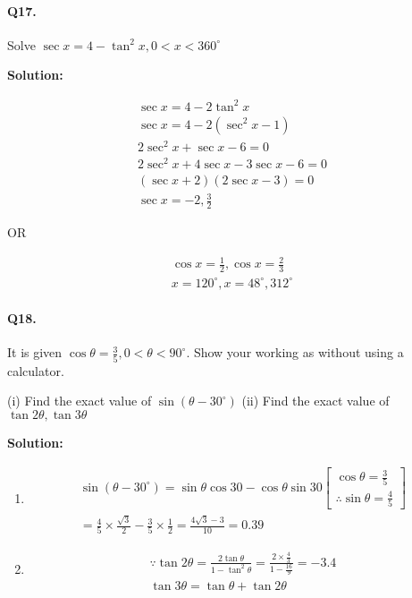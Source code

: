 \documentclass{article}
\begin{document}
\paragraph{Q17.}
Solve $\sec x = 4 - \tan^{2}x, 0 < x < 360^{\circ}$

{\scriptsize \textbf{Solution:}}

\[
  \begin{aligned}
    \sec x = 4 - 2\tan^{2}x \\
    \sec x = 4 - 2(\sec^{2}x - 1) \\
    2\sec^{2}x + \sec x - 6 = 0 \\
    2\sec^{2}x + 4\sec x - 3\sec x - 6 = 0 \\
    (\sec x + 2)(2\sec x - 3) = 0 \\
    \sec x = -2, \frac{3}{2}
  \end{aligned}
\]

OR

\[
  \begin{aligned}
    \cos x = \frac{1}{2}, \cos x = \frac{2}{3} \\
    x = 120^{\circ}, x = 48^{\circ}, 312^{\circ}
  \end{aligned}
\]

\paragraph{Q18.}
It is given $\cos\theta = \frac{3}{5}, 0 < \theta < 90^{\circ}$. Show your working as without using a calculator.

(i) Find the exact value of $\sin(\theta - 30^{\circ})$
(ii) Find the exact value of $\tan 2\theta, \tan 3\theta$

{\scriptsize \textbf{Solution:}}

\begin{enumerate}[label=\roman*)]
  \item
        \[
        \begin{aligned}
          \sin(\theta - 30^{\circ}) = \sin\theta \cos 30 - \cos\theta \sin 30 \left[ \begin{array}{cc} \cos\theta = \frac{3}{5} \\ \therefore \sin\theta = \frac{4}{5} \end{array} \right] \\
          = \frac{4}{5} \times \frac{\sqrt{3}}{2} - \frac{3}{5} \times \frac{1}{2} = \frac{4 \sqrt{3} - 3}{10} = 0.39
        \end{aligned}
        \]
  \item
        \[
        \begin{aligned}
          \because \tan 2\theta = \frac{2\tan\theta}{1-\tan^{2}\theta} = \frac{2 \times \frac{4}{3}}{1 - \frac{16}{9}} = -3.4 \\
          \tan 3\theta = \tan\theta + \tan 2\theta
        \end{aligned}
        \]
\end{enumerate}
\end{document}
